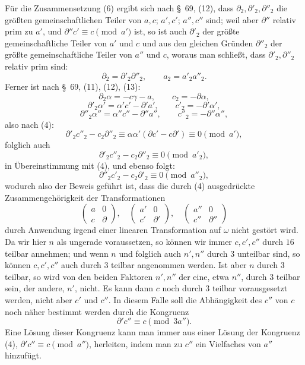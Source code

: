 \documentclass[11pt]{article}
\begin{document}
Für die Zusammensetzung (6) ergibt sich nach \S~69, (12), dass $\partial_2,\partial'_2,\partial''_2$ die größten gemeinschaftlichen Teiler von $a,c$; $a',c'$; $a'',c''$ sind; weil aber $\partial''$ relativ prim zu $a'$, und $\partial''c'\equiv c\pmod {a'}$ ist, so ist auch $\partial'_2$ der größte gemeinschaftliche Teiler von $a'$ und $c$ und aus den gleichen Gründen $\partial''_2$ der größte gemeinschaftliche Teiler von $a''$ und $c$, woraus man schließt, dass $\partial'_2,\partial''_2$ relativ prim sind:
\[
 \partial_2=\partial'_2\partial''_2,
 \qquad a_2=a'_2a''_2.
\]
Ferner ist nach \S~69, (11), (12), (13):
\[
 \partial_2\alpha=-c\gamma-a,
 \qquad c_2=-\partial\alpha,
\]
\[
 \partial'_2\alpha'=\alpha'c'-\partial' a',
 \qquad c'_2=-\partial'\alpha',
\]
\[
 \partial''_2\alpha''=\alpha''c''-\partial''a'',
 \qquad c''_2=-\partial''\alpha'',
\]
also nach (4):
\[
 \partial'_2c''_2-c_2\partial''_2\equiv \alpha\alpha'(\partial c'-c\partial')\equiv0\pmod {a'},
\]
folglich auch
\[
 \partial'_2c''_2-c_2\partial''_2\equiv0\pmod {a'_2},
\]
in Übereinstimmung mit (4), und ebenso folgt:
\[
 \partial''_2c'_2-c_2\partial'_2\equiv0\pmod {a''_2},
\]
wodurch also der Beweis geführt ist, dass die durch (4) ausgedrückte Zusammengehörigkeit der Transformationen
\[
 \begin{pmatrix}a&0\\ c&\partial\end{pmatrix},
 \quad
 \begin{pmatrix}a'&0\\ c'&\partial'\end{pmatrix},
 \quad
 \begin{pmatrix}a''&0\\ c''&\partial''\end{pmatrix}
\]
durch Anwendung irgend einer linearen Transformation auf $\omega$ nicht gestört wird. Da wir hier $n$ als ungerade voraussetzen, so können wir immer $c,c',c''$ durch $16$ teilbar annehmen; und wenn $n$ und folglich auch $n',n''$ durch $3$ unteilbar sind, so können $c,c',c''$ auch durch $3$ teilbar angenommen werden. Ist aber $n$ durch $3$ teilbar, so wird von den beiden Faktoren $n',n''$ der eine, etwa $n''$, durch $3$ teilbar sein, der andere, $n'$, nicht. Es kann dann $c$ noch durch $3$ teilbar vorausgesetzt werden, nicht aber $c'$ und $c''$. In diesem Falle soll die Abhängigkeit des $c''$ von $c$ noch näher bestimmt werden durch die Kongruenz
\begin{equation}
 \partial'c''\equiv c\pmod {3a''}.
\tag{7}
\end{equation}
Eine Lösung dieser Kongruenz kann man immer aus einer Lösung der Kongruenz (4), $\partial'c''\equiv c\pmod {a''}$, herleiten, indem man zu $c''$ ein Vielfaches von $a''$ hinzufügt.
\end{document}

